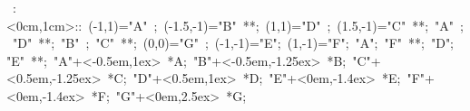 

\hbox{
\xy    <1cm,0cm>:<0cm,1cm>::
       (-1,1)="A" ; (-1.5,-1)="B" **\dir{-};
       (1,1)="D" ; (1.5,-1)="C" **\dir{-};
       "A" ; "D" **\dir{-};
       "B" ; "C" **\dir{-};
       (0,0)="G" ; (-1,-1)="E"; (1,-1)="F";
       "A"; "F" **\dir{-};
       "D"; "E" **\dir{-};
       "A"+<-0.5em,1ex> *{A}; 
       "B"+<-0.5em,-1.25ex> *{B}; 
       "C"+<0.5em,-1.25ex> *{C}; 
       "D"+<0.5em,1ex> *{D}; 
       "E"+<0em,-1.4ex> *{E}; 
       "F"+<0em,-1.4ex> *{F}; 
       "G"+<0em,2.5ex> *{G}; 
       \endxy}
